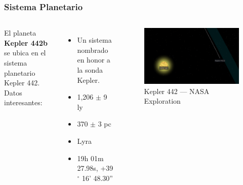 \documentclass[UKenglish]{beamer}
\begin{document}
\begin{frame}
\frametitle{Sistema Planetario}

\begin{columns}

El planeta \textbf{Kepler 442b} se ubica en el sistema planetario Kepler 442.\\
Datos interesantes: 

\begin{itemize}
\item Un sistema nombrado en honor a la sonda Kepler.
\item 1,206 $\pm$  9 ly
\item 370 $\pm$ 3 pc
\item Lyra
\item 19h 01m 27.98s, +39$^{\circ}$ 16' 48.30''
\end{itemize}


  \begin{figure}[t!]
    \centering
    \includegraphics[scale=0.2]{Imagenes/5}
    \caption{Kepler 442 — NASA Exploration}
    \label{fig:punt4os}
    \end{figure}
\end{columns}
\end{frame}
\end{document}
